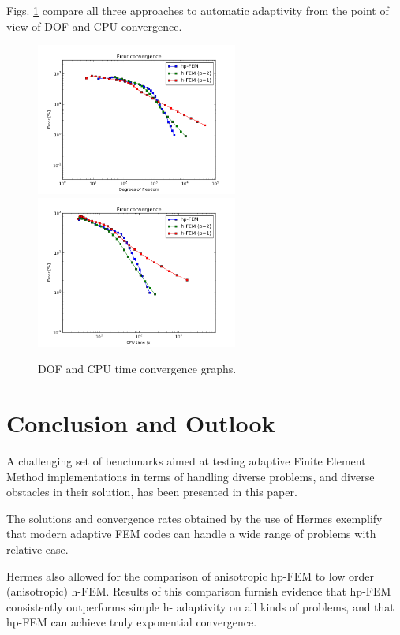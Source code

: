 \documentclass[12pt]{elsarticle}
\begin{document}
Figs. \ref{fig:nist-12-conv} compare all
three approaches to automatic adaptivity from the point
of view of DOF and CPU convergence.

\begin{figure}[!ht]
\centering
\includegraphics[height=5cm]{nist/nist-12/conv_dof_aniso.png}\ \
\includegraphics[height=5cm]{nist/nist-12/conv_cpu_aniso.png}
\caption{DOF and CPU time convergence graphs.}
\label{fig:nist-12-conv}
\end{figure}




\section{Conclusion and Outlook}
\label{sec:conclusion}

A challenging set of benchmarks aimed at testing adaptive Finite Element Method implementations in terms of handling diverse problems, and diverse obstacles in their solution, has been presented in this paper.

The solutions and convergence rates obtained by the use of Hermes exemplify that modern adaptive FEM codes can handle a wide range of problems with relative ease.

Hermes also allowed for the comparison of anisotropic hp-FEM to low order (anisotropic) h-FEM. Results of this comparison furnish evidence that hp-FEM consistently outperforms simple h- adaptivity on all kinds of problems, and that hp-FEM can achieve truly exponential convergence.
\end{document}
